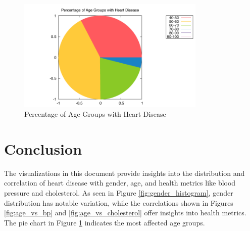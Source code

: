 \documentclass{article}
\begin{document}
\begin{figure}[h]
    \centering
    \includegraphics[width=0.8\textwidth]{percentage_of_age_groups_vs_heart_disease.pdf}
    \caption{Percentage of Age Groups with Heart Disease}
    \label{fig:age_group_pie}
\end{figure}

\section{Conclusion}
The visualizations in this document provide insights into the distribution and correlation of heart disease with gender, age, and health metrics like blood pressure and cholesterol. As seen in Figure \ref{fig:gender_histogram}, gender distribution has notable variation, while the correlations shown in Figures \ref{fig:age_vs_bp} and \ref{fig:age_vs_cholesterol} offer insights into health metrics. The pie chart in Figure \ref{fig:age_group_pie} indicates the most affected age groups.
\end{document}
